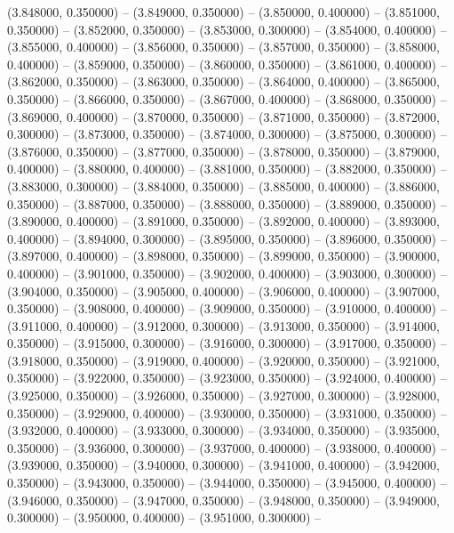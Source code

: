 (3.848000, 0.350000) -- 
(3.849000, 0.350000) -- 
(3.850000, 0.400000) -- 
(3.851000, 0.350000) -- 
(3.852000, 0.350000) -- 
(3.853000, 0.300000) -- 
(3.854000, 0.400000) -- 
(3.855000, 0.400000) -- 
(3.856000, 0.350000) -- 
(3.857000, 0.350000) -- 
(3.858000, 0.400000) -- 
(3.859000, 0.350000) -- 
(3.860000, 0.350000) -- 
(3.861000, 0.400000) -- 
(3.862000, 0.350000) -- 
(3.863000, 0.350000) -- 
(3.864000, 0.400000) -- 
(3.865000, 0.350000) -- 
(3.866000, 0.350000) -- 
(3.867000, 0.400000) -- 
(3.868000, 0.350000) -- 
(3.869000, 0.400000) -- 
(3.870000, 0.350000) -- 
(3.871000, 0.350000) -- 
(3.872000, 0.300000) -- 
(3.873000, 0.350000) -- 
(3.874000, 0.300000) -- 
(3.875000, 0.300000) -- 
(3.876000, 0.350000) -- 
(3.877000, 0.350000) -- 
(3.878000, 0.350000) -- 
(3.879000, 0.400000) -- 
(3.880000, 0.400000) -- 
(3.881000, 0.350000) -- 
(3.882000, 0.350000) -- 
(3.883000, 0.300000) -- 
(3.884000, 0.350000) -- 
(3.885000, 0.400000) -- 
(3.886000, 0.350000) -- 
(3.887000, 0.350000) -- 
(3.888000, 0.350000) -- 
(3.889000, 0.350000) -- 
(3.890000, 0.400000) -- 
(3.891000, 0.350000) -- 
(3.892000, 0.400000) -- 
(3.893000, 0.400000) -- 
(3.894000, 0.300000) -- 
(3.895000, 0.350000) -- 
(3.896000, 0.350000) -- 
(3.897000, 0.400000) -- 
(3.898000, 0.350000) -- 
(3.899000, 0.350000) -- 
(3.900000, 0.400000) -- 
(3.901000, 0.350000) -- 
(3.902000, 0.400000) -- 
(3.903000, 0.300000) -- 
(3.904000, 0.350000) -- 
(3.905000, 0.400000) -- 
(3.906000, 0.400000) -- 
(3.907000, 0.350000) -- 
(3.908000, 0.400000) -- 
(3.909000, 0.350000) -- 
(3.910000, 0.400000) -- 
(3.911000, 0.400000) -- 
(3.912000, 0.300000) -- 
(3.913000, 0.350000) -- 
(3.914000, 0.350000) -- 
(3.915000, 0.300000) -- 
(3.916000, 0.300000) -- 
(3.917000, 0.350000) -- 
(3.918000, 0.350000) -- 
(3.919000, 0.400000) -- 
(3.920000, 0.350000) -- 
(3.921000, 0.350000) -- 
(3.922000, 0.350000) -- 
(3.923000, 0.350000) -- 
(3.924000, 0.400000) -- 
(3.925000, 0.350000) -- 
(3.926000, 0.350000) -- 
(3.927000, 0.300000) -- 
(3.928000, 0.350000) -- 
(3.929000, 0.400000) -- 
(3.930000, 0.350000) -- 
(3.931000, 0.350000) -- 
(3.932000, 0.400000) -- 
(3.933000, 0.300000) -- 
(3.934000, 0.350000) -- 
(3.935000, 0.350000) -- 
(3.936000, 0.300000) -- 
(3.937000, 0.400000) -- 
(3.938000, 0.400000) -- 
(3.939000, 0.350000) -- 
(3.940000, 0.300000) -- 
(3.941000, 0.400000) -- 
(3.942000, 0.350000) -- 
(3.943000, 0.350000) -- 
(3.944000, 0.350000) -- 
(3.945000, 0.400000) -- 
(3.946000, 0.350000) -- 
(3.947000, 0.350000) -- 
(3.948000, 0.350000) -- 
(3.949000, 0.300000) -- 
(3.950000, 0.400000) -- 
(3.951000, 0.300000) -- 
